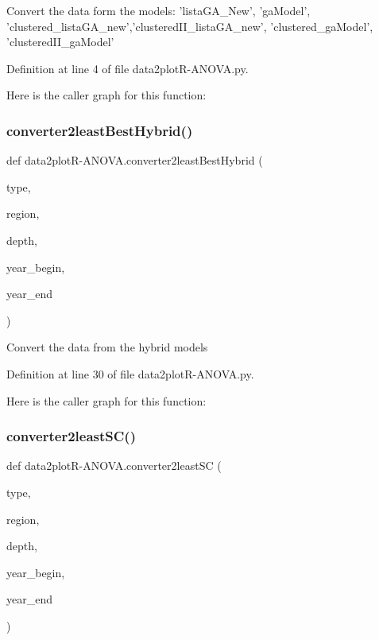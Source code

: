 \begin{DoxyVerb}Convert the data form the models: 'listaGA_New', 'gaModel', 'clustered_listaGA_new','clusteredII_listaGA_new', 'clustered_gaModel', 'clusteredII_gaModel'
\end{DoxyVerb}
 

Definition at line 4 of file data2plot\+R-\/\+A\+N\+O\+V\+A.\+py.

Here is the caller graph for this function\+:
\mbox{\label{namespacedata2plot_r-_a_n_o_v_a_a52bf879d3542185ef4d184db239b9085}} 
\subsubsection{\texorpdfstring{converter2least\+Best\+Hybrid()}{converter2leastBestHybrid()}}
{\footnotesize\ttfamily def data2plotR-\/A\+N\+O\+V\+A.\+converter2least\+Best\+Hybrid (\begin{DoxyParamCaption}\item[{}]{type,  }\item[{}]{region,  }\item[{}]{depth,  }\item[{}]{year\+\_\+begin,  }\item[{}]{year\+\_\+end }\end{DoxyParamCaption})}

\begin{DoxyVerb}Convert the data from the hybrid models 
\end{DoxyVerb}
 

Definition at line 30 of file data2plot\+R-\/\+A\+N\+O\+V\+A.\+py.

Here is the caller graph for this function\+:
\mbox{\label{namespacedata2plot_r-_a_n_o_v_a_ab61a4a03e766a1cebbe27e57446b042e}} 
\subsubsection{\texorpdfstring{converter2least\+S\+C()}{converter2leastSC()}}
{\footnotesize\ttfamily def data2plotR-\/A\+N\+O\+V\+A.\+converter2least\+SC (\begin{DoxyParamCaption}\item[{}]{type,  }\item[{}]{region,  }\item[{}]{depth,  }\item[{}]{year\+\_\+begin,  }\item[{}]{year\+\_\+end }\end{DoxyParamCaption})}

